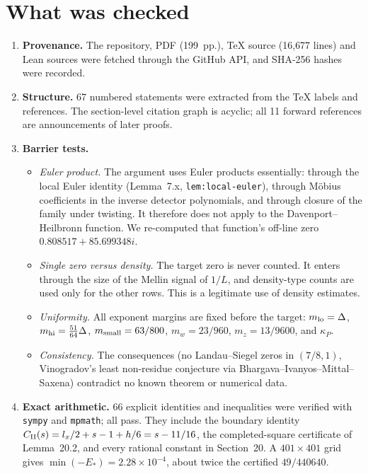 \documentclass[11pt,a4paper]{article}
\begin{document}
\section{What was checked}
\begin{enumerate}
\item \textbf{Provenance.} The repository, PDF (199~pp.), \TeX{} source (16{,}677 lines) and Lean sources were
  fetched through the GitHub API, and SHA-256 hashes were recorded.
\item \textbf{Structure.} 67 numbered statements were extracted from the \TeX{} labels and references. The
  section-level citation graph is acyclic; all 11 forward references are announcements of later proofs.
\item \textbf{Barrier tests.}
  \begin{itemize}
  \item \emph{Euler product.} The argument uses Euler products essentially: through the local Euler identity
    (Lemma~7.x, \texttt{lem:local-euler}), through M\"obius coefficients in the inverse detector polynomials,
    and through closure of the family under twisting. It therefore does not apply to the Davenport--Heilbronn
    function. We re-computed that function's off-line zero $0.808517+85.699348i$.
  \item \emph{Single zero versus density.} The target zero is never counted. It enters through the size of the
    Mellin signal of $1/L$, and density-type counts are used only for the other rows. This is a legitimate use
    of density estimates.
  \item \emph{Uniformity.} All exponent margins are fixed before the target: $m_{\rm lo}=\Delta$,
    $m_{\rm hi}=\tfrac{51}{64}\Delta$, $m_{\rm small}=63/800$, $m_w=23/960$, $m_z=13/9600$, and $\kappa_P$.
  \item \emph{Consistency.} The consequences (no Landau--Siegel zeros in $(7/8,1)$, Vinogradov's least
    non-residue conjecture via Bhargava--Ivanyos--Mittal--Saxena) contradict no known theorem or numerical data.
  \end{itemize}
\item \textbf{Exact arithmetic.} 66 explicit identities and inequalities were verified with \texttt{sympy}
  and \texttt{mpmath}; all pass. They include the boundary identity
  $C_{\rm II}(s)=l_x/2+s-1+h/6=s-11/16$, the completed-square certificate of Lemma~20.2, and every rational
  constant in Section~20. A $401\times401$ grid gives $\min(-E_*)=2.28\times10^{-4}$, about twice the
  certified $49/440640$.
\end{enumerate}
\end{document}
